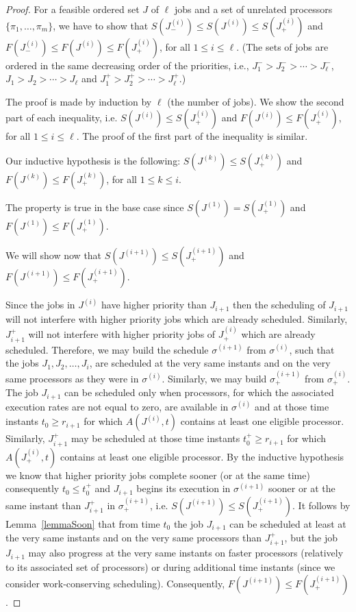 \documentclass[a4paper,11pt]{article}
\begin{document}
\begin{proof}
  For a feasible ordered set $J$ of $\ell$ jobs and a set of unrelated
  processors $\{\pi_1, \ldots, \pi_m\}$, we have to show that
  $S(J^{(i)}_{-}) \leq S(J^{(i)}) \leq S(J^{(i)}_{+})$ and
  $F(J^{(i)}_{-}) \leq F(J^{(i)}) \leq F(J^{(i)}_{+})$, for all $1
  \leq i \leq \ell$. (The sets of jobs are ordered in the same
  decreasing order of the priorities, i.e., $J_1^{-} > J_2^{-} >
  \cdots > J_{\ell}^{-}$, $J_1 > J_2 > \cdots > J_{\ell}$ and $J_1^{+}
  > J_2^{+} > \cdots > J_{\ell}^{+}$.)

  The proof is made by induction by $\ell$ (the number of jobs). We
  show the second part of each inequality, i.e. $ S(J^{(i)}) \leq
  S(J^{(i)}_{+})$ and $ F(J^{(i)}) \leq F(J^{(i)}_{+})$, for all $1
  \leq i \leq \ell$. The proof of the first part of the inequality is
  similar.

  Our inductive hypothesis is the following: $ S(J^{(k)}) \leq
  S(J^{(k)}_{+})$ and $ F(J^{(k)}) \leq F(J^{(k)}_{+})$, for all $1
  \leq k \leq i$.

  The property is true in the base case since $S(J^{(1)}) =
  S(J^{(1)}_{+})$ and $F(J^{(1)}) \leq F(J^{(1)}_{+})$.

  We will show now that $ S(J^{(i+1)}) \leq S(J^{(i+1)}_{+})$ and
  $F(J^{(i+1)}) \leq F(J^{(i+1)}_{+})$.

  Since the jobs in $J^{(i)}$ have higher priority than $J_{i+1}$ then
  the scheduling of $J_{i+1}$ will not interfere with higher priority
  jobs which are already scheduled. Similarly, $J^{+}_{i+1}$ will not
  interfere with higher priority jobs of $J^{(i)}_{+}$ which are
  already scheduled.  Therefore, we may build the schedule
  $\sigma^{(i+1)}$ from $\sigma^{(i)}$, such that the jobs $J_1, J_2,
  \ldots, J_{i}$, are scheduled at the very same instants and on the
  very same processors as they were in $\sigma^{(i)}$. Similarly, we
  may build $\sigma^{(i+1)}_{+}$ from $\sigma^{(i)}_{+}$.  The job
  $J_{i+1}$ can be scheduled only when processors, for which the
  associated execution rates are not equal to zero, are available in
  $\sigma^{(i)}$ and at those time instants $t_0 \geq r_{i+1}$ for
  which $A(J^{(i)},t)$ contains at least one eligible
  processor. Similarly, $J^{+}_{i+1}$ may be scheduled at those time
  instants $t_0^{+} \geq r_{i+1}$ for which $A(J^{(i)}_{+},t) $
  contains at least one eligible processor. By the inductive
  hypothesis we know that higher priority jobs complete sooner (or at
  the same time) consequently $t_0 \leq t_0^{+}$ and $J_{i+1}$ begins
  its execution in $\sigma^{(i+1)}$ sooner or at the same instant than
  $J_{i+1}^{+}$ in $\sigma^{(i+1)}_{+}$, i.e. $ S(J^{(i+1)}) \leq
  S(J^{(i+1)}_{+})$. It follows by Lemma~\ref{lemmaSoon} that from
  time $t_{0}$ the job $J_{i+1}$ can be scheduled at least at the very
  same instants and on the very same processors than $J_{i+1}^{+}$,
  but the job $J_{i+1}$ may also progress at the very same instants on
  faster processors (relatively to its associated set of processors)
  or during additional time instants (since we consider
  work-conserving scheduling). Consequently, $F(J^{(i+1)}) \leq
  F(J^{(i+1)}_{+})$.
\end{proof}
\end{document}
